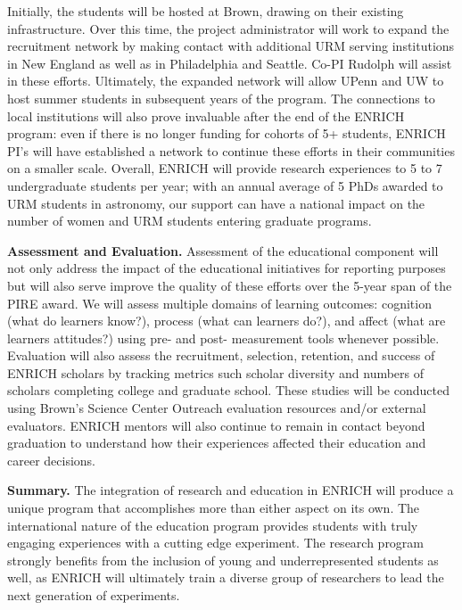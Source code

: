 \documentclass[preprint,11pt]{aastex}
\begin{document}
Initially, the students will be hosted at Brown, drawing on their existing infrastructure.  Over this time, the project administrator will work to expand the recruitment network by making contact with additional URM serving institutions in New England as well as in Philadelphia and Seattle.  Co-PI Rudolph will assist in these efforts.  Ultimately, the expanded network will allow UPenn and UW to host summer students in subsequent years of the program.  The connections to local institutions will also prove invaluable after the end of the ENRICH program: even if there is no longer funding for cohorts of 5+ students, ENRICH PI's will have established a network to continue these efforts in their communities on a smaller scale.
 Overall, ENRICH will provide research experiences to 5 to 7 undergraduate students per year; with an annual average of 5 PhDs awarded to URM students in astronomy, our support can have a national impact on the number of women and URM students entering graduate programs.

\textbf{Assessment and Evaluation.} Assessment of the educational component will not only address the impact of the educational initiatives for reporting purposes but will also serve improve the quality of these efforts over the 5-year span of the PIRE award.  We will assess multiple domains of learning outcomes: cognition (what do learners know?), process (what can learners do?), and affect (what are learners attitudes?) using pre- and post- measurement tools whenever possible.  Evaluation will also assess the recruitment, selection, retention, and success of ENRICH scholars by tracking metrics such scholar diversity and numbers of scholars completing college and graduate school. These studies will be conducted using Brown's Science Center Outreach evaluation resources and/or external evaluators.  ENRICH mentors will also continue to remain in contact beyond graduation to understand how their experiences affected their education and career decisions.

\textbf{Summary.} The integration of research and education in ENRICH will produce a unique program that accomplishes more than either aspect on its own.  The international nature of the education program provides students with truly engaging experiences with a cutting edge experiment.  The research program strongly benefits from the inclusion of young and underrepresented students as well, as ENRICH will ultimately train a diverse group of researchers to lead the next generation of experiments.  

\clearpage
\setcounter{page}{1}
\thispagestyle{empty}


\end{document}
